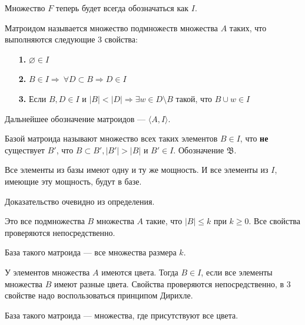 \documentclass[a4paper, 12pt]{article}
\begin{document}
Множество $F$ теперь будет всегда обозначаться как $I$.

Матроидом называется множество подмножеств множества $A$ таких, что выполняются 
следующие 3 свойства:
\begin{itemize}
  \item[{\bf 1.}] $\varnothing \in I$

  \item[{\bf 2.}] $B \in I \Rightarrow \ \forall D \subset B \Rightarrow D \in I$

  \item[{\bf 3.}] Если $B, D \in I$ и $|B| < |D| \Rightarrow \exists w \in D 
  \setminus B$ такой, что $B \cup w \in I$ 
\end{itemize}

Дальнейшее обозначение матроидов --- $\langle A, I\rangle$.

\begin{Def}
  Базой матроида называют множество всех таких элементов $B \in I$, что {\bf не}
   существует $B'$, что $B \subset B', |B'|>|B|$ и $B' \in I$. Обозначение $\mathfrak{B}$.
\end{Def}

\begin{Properties}
  Все элементы из базы имеют одну и ту же мощность. И все элементы из $I$, имеющие
  эту мощность, будут в базе.

  Доказательство очевидно из определения.
\end{Properties}

\begin{Examples}
  Это все подмножества $B$ множества $A$ такие, что
  $|B| \leqslant k$ при $k \geqslant 0$. Все свойства проверяются
  непосредственно. 

  База такого матроида --- все множества 
  размера $k$.
\end{Examples}

\begin{Examples}
  У элементов множества $A$ имеются цвета. Тогда $B \in I$, 
  если все элементы множества $B$ имеют разные цвета. 
  Свойства проверяются непосредственно, в 3 свойстве надо воспользоваться
  принципом Дирихле.

  База такого матроида --- множества, где присутствуют все цвета.
\end{Examples}
\end{document}
